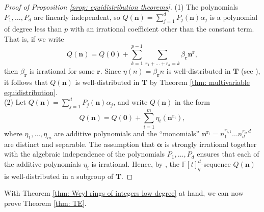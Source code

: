 \documentclass{amsart}
\theoremstyle{definition}
\numberwithin{equation}{section}
\newcommand{\F}{\mathbb{F}}
\begin{document}
\begin{proof}[Proof of Proposition \ref{prop: equidistribution theorems}]
    (1) The polynomials $P_1, \ldots, P_d$ are linearly independent, so $Q(\bm{n}) = \sum_{j=1}^d P_j(\bm{n}) \alpha_j$ is a polynomial of degree less than $p$ with an irrational coefficient other than the constant term.
    That is, if we write
    \begin{equation*}
        Q(\bm{n}) = Q(\bm{0}) + \sum_{k=1}^{p-1} \sum_{r_1+\ldots+r_d=k} \beta_{\bm{r}} \bm{n}^{\bm{r}},
    \end{equation*}
    then $\beta_{\bm{r}}$ is irrational for some $\bm{r}$.
    Since $\eta(n) = \beta_{\bm{r}}n$ is well-distributed in $\mathbf{T}$ (see \cite[Theorem 0.1]{bl}), it follows that $Q(\bm{n})$ is well-distributed in $\mathbf{T}$ by Theorem \ref{thm: multivariable equidistribution}. \\

    (2) Let $Q(\bm{n}) = \sum_{j=1}^d P_j(\bm{n}) \alpha_j$, and write $Q(\bm{n})$ in the form
    \begin{equation*}
        Q(\bm{n}) = Q(\bm{0}) + \sum_{i=1}^m \eta_i(\bm{n}^{\bm{r}_i}),
    \end{equation*}
    where $\eta_1, \ldots, \eta_m$ are additive polynomials and the ``monomials'' $\bm{n}^{\bm{r}_i} = n_1^{r_{i,1}} \ldots n_d^{r_i,d}$ are distinct and separable.
    The assumption that $\bm{\alpha}$ is strongly irrational together with the algebraic independence of the polynomials $P_1, \ldots, P_d$ ensures that each of the additive polynomials $\eta_i$ is irrational.
    Hence, by \cite[Theorem 10.1]{bl}, the $\F[t]_q^d$-sequence $Q(\bm{n})$ is well-distributed in a subgroup of $\mathbf{T}$.
\end{proof}

With Theorem \ref{thm: Weyl rings of integers low degree} at hand, we can now prove Theorem \ref{thm: TE}.
\end{document}
